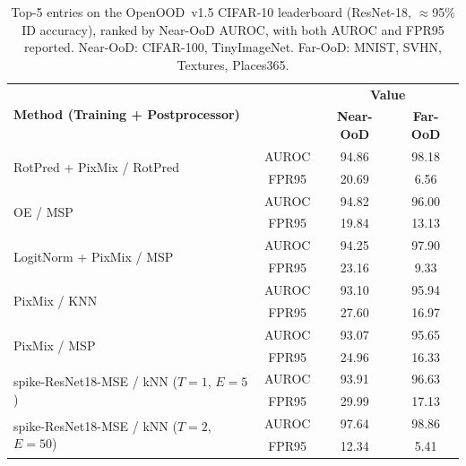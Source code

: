 \documentclass{ieeeaccess}
\newcommand{\fprname}{\cellcolor{labelgray}\scriptsize\hspace{0.3em}FPR95}
\newcommand{\aurocname}{\cellcolor{labelgray}\scriptsize AUROC}
\begin{document}
\begin{table}[!htb]
\caption{Top-5 entries on the OpenOOD~v1.5 CIFAR-10 leaderboard (ResNet-18, $\approx$95\% ID accuracy), ranked by Near-OoD AUROC, with both AUROC and FPR95 reported. Near-OoD: CIFAR-100, TinyImageNet. Far-OoD: MNIST, SVHN, Textures, Places365.}
\begin{center}
\small
\begin{tabular}{p{6.2cm}c|c|c}
\multirow{2}{*}{\textbf{Method (Training + Postprocessor)}} & \multirow{2}{*}{}
  & \multicolumn{2}{c}{\textbf{Value}} \\
  & & \textbf{Near-OoD} & \textbf{Far-OoD} \\
\hline
\multirow{2}{*}{RotPred + PixMix / RotPred \cite{NEURIPS2019, Hendrycks_2022_CVPR}} & \aurocname & 94.86 & 98.18 \\
 & \fprname & 20.69 & 6.56 \\
\hline
\multirow{2}{*}{OE / MSP \cite{hendrycks2018deep, hendrycks2017baseline}} & \aurocname & 94.82 & 96.00 \\
 & \fprname & 19.84 & 13.13 \\
\hline
\multirow{2}{*}{LogitNorm + PixMix / MSP \cite{pmlr-v162-wei22d, Hendrycks_2022_CVPR, hendrycks2017baseline}} & \aurocname & 94.25 & 97.90 \\
 & \fprname & 23.16 & 9.33 \\
\hline
\multirow{2}{*}{PixMix / KNN \cite{Hendrycks_2022_CVPR, sun2022knn}} & \aurocname & 93.10 & 95.94 \\
 & \fprname & 27.60 & 16.97 \\
\hline
\multirow{2}{*}{PixMix / MSP \cite{Hendrycks_2022_CVPR, hendrycks2017baseline}} & \aurocname & 93.07 & 95.65 \\
 & \fprname & 24.96 & 16.33 \\
\hline
\hline
\multirow{2}{*}{spike-ResNet18-MSE / kNN ($T{=}1$, $E{=}5$)} & \aurocname & 93.91 & 96.63 \\
 & \fprname & 29.99 & 17.13 \\
\hline
\multirow{2}{*}{spike-ResNet18-MSE / kNN ($T{=}2$, $E{=}50$)} & \aurocname & 97.64 & 98.86 \\
 & \fprname & 12.34 & 5.41 \\
\end{tabular}
\label{tab:openood-cifar10}
\end{center}
\end{table}
\end{document}
